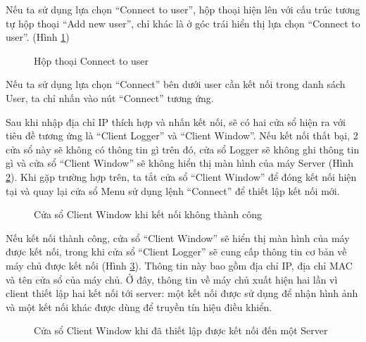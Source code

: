 Nếu ta sử dụng lựa chọn ``Connect to user'', hộp thoại hiện lên với cấu trúc tương tự hộp thoại ``Add new user'', chỉ khác là ở góc trái hiển thị lựa chọn ``Connect to user''. (Hình \ref{fig:ConnectToUserBox})

\begin{figure}[H]
	\caption{Hộp thoại Connect to user}
	\label{fig:ConnectToUserBox}
\end{figure}

Nếu ta sử dụng lựa chọn ``Connect'' bên dưới user cần kết nối trong danh sách User, ta chỉ nhấn vào nút ``Connect'' tương ứng.

Sau khi nhập địa chỉ IP thích hợp và nhấn kết nối, sẽ có hai cửa sổ hiện ra với tiêu đề tương ứng là ``Client Logger'' và ``Client Window''. Nếu kết nối thất bại, 2 cửa sổ này sẽ không có thông tin gì trên đó, cửa sổ Logger sẽ không ghi thông tin gì và cửa sổ ``Client Window'' sẽ không hiển thị màn hình của máy Server (Hình \ref{fig:ClientWindowFailed}). Khi gặp trường hợp trên, ta tắt cửa sổ ``Client Window'' để đóng kết nối hiện tại và quay lại cửa sổ Menu sử dụng lệnh ``Connect'' để thiết lập kết nối mới.

\begin{figure}[H]
	\caption{Cửa sổ Client Window khi kết nối không thành công}
	\label{fig:ClientWindowFailed}
\end{figure}

Nếu kết nối thành công, cửa sổ ``Client Window'' sẽ hiển thị màn hình của máy được kết nối, trong khi cửa sổ ``Client Logger'' sẽ cung cấp thông tin cơ bản về máy chủ được kết nối (Hình \ref{fig:ClientWindowConnected}). Thông tin này bao gồm địa chỉ IP, địa chỉ MAC và tên cửa sổ của máy chủ. Ở đây, thông tin về máy chủ xuất hiện hai lần vì client thiết lập hai kết nối tới server: một kết nối được sử dụng để nhận hình ảnh và một kết nối khác được dùng để truyền tín hiệu điều khiển.

\begin{figure}[H]
	\caption{Cửa sổ Client Window khi đã thiết lập được kết nối đến một Server}
	\label{fig:ClientWindowConnected}
\end{figure}

